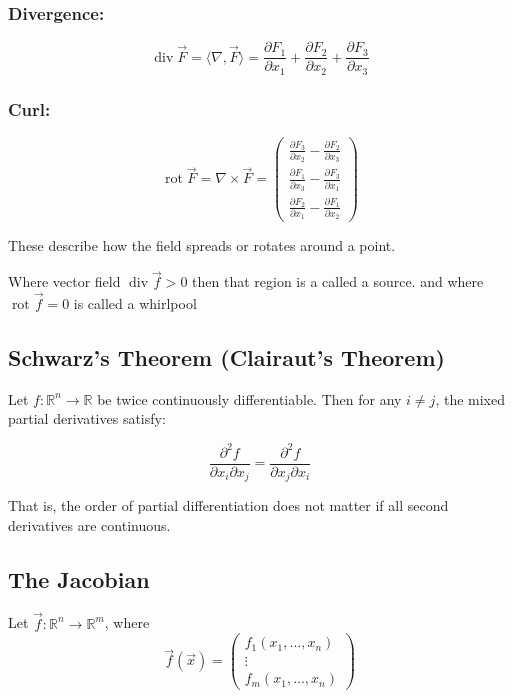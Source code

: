 \subsubsection{Divergence:}
\[
\operatorname{div} \vec{F} = \langle\nabla, \vec{F}\rangle = \frac{\partial F_1}{\partial x_1} + \frac{\partial F_2}{\partial x_2} + \frac{\partial F_3}{\partial x_3}
\]

\subsubsection{Curl:}
\[
\operatorname{rot} \vec{F} = \nabla \times \vec{F} = \begin{pmatrix}
\frac{\partial F_3}{\partial x_2} - \frac{\partial F_2}{\partial x_3} \\
\frac{\partial F_1}{\partial x_3} - \frac{\partial F_3}{\partial x_1} \\
\frac{\partial F_2}{\partial x_1} - \frac{\partial F_1}{\partial x_2}
\end{pmatrix}
\]

These describe how the field spreads or rotates around a point.

Where vector field \( \operatorname{div}\vec{f} > 0\) then that region is a called a source.
and where \(\operatorname{rot}\vec{f} = 0\) is called a whirlpool

\subsection{Schwarz’s Theorem (Clairaut’s Theorem)}

Let \( f : \mathbb{R}^n \to \mathbb{R} \) be twice continuously differentiable. Then for any \( i \ne j \), the mixed partial derivatives satisfy:

\[
\frac{\partial^2 f}{\partial x_i \partial x_j} = \frac{\partial^2 f}{\partial x_j \partial x_i}
\]

That is, the order of partial differentiation does not matter if all second derivatives are continuous.

\subsection{The Jacobian}

Let \( \vec{f} : \mathbb{R}^n \to \mathbb{R}^m \), where
\[
\vec{f}(\vec{x}) = \begin{pmatrix}
f_1(x_1, \dots, x_n) \\
\vdots \\
f_m(x_1, \dots, x_n)
\end{pmatrix}
\]

